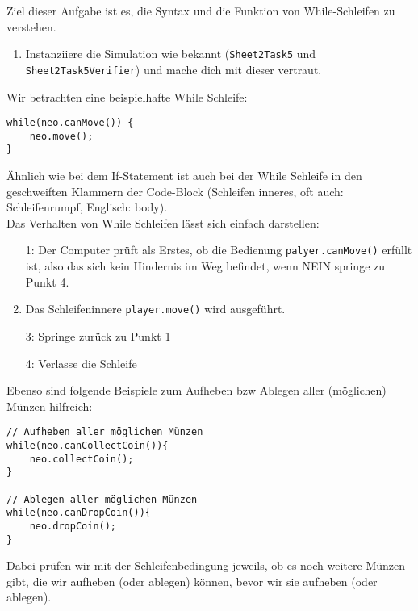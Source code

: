 

Ziel dieser Aufgabe ist es, die Syntax und die Funktion von While-Schleifen zu verstehen.

\begin{enumerate}
    \item Instanziiere die Simulation wie bekannt (\lstinline{Sheet2Task5} und \lstinline{Sheet2Task5Verifier}) und mache dich mit dieser vertraut.
\end{enumerate}


\begin{Infobox}
    Wir betrachten eine beispielhafte While Schleife:

    \begin{lstlisting}[breaklines=true, numbers=none]
while(neo.canMove()) {
    neo.move();
}
    \end{lstlisting}

    Ähnlich wie bei dem If-Statement ist auch bei der While Schleife in den geschweiften Klammern der Code-Block (Schleifen inneres, oft auch: Schleifenrumpf, Englisch: body).\\

    Das Verhalten von While Schleifen lässt sich einfach darstellen:
    \begin{enumerate}
        \item[1:] Der Computer prüft als Erstes, ob die Bedienung \lstinline{palyer.canMove()} erfüllt ist, also das sich kein Hindernis im Weg befindet, wenn NEIN springe zu Punkt 4.
        \item[2:] Das Schleifeninnere \lstinline{player.move()} wird ausgeführt.
        \item[3:] Springe zurück zu Punkt 1
        \item[4:] Verlasse die Schleife
    \end{enumerate}

    Ebenso sind folgende Beispiele zum Aufheben bzw Ablegen aller (möglichen) Münzen hilfreich:

    \begin{lstlisting}[breaklines=true, numbers=none]
// Aufheben aller möglichen Münzen
while(neo.canCollectCoin()){
    neo.collectCoin();
}

// Ablegen aller möglichen Münzen
while(neo.canDropCoin()){
    neo.dropCoin();
}
    \end{lstlisting}

    Dabei prüfen wir mit der Schleifenbedingung jeweils, ob es noch weitere Münzen gibt, die wir aufheben (oder ablegen) können, bevor wir sie aufheben (oder ablegen).
\end{Infobox}



